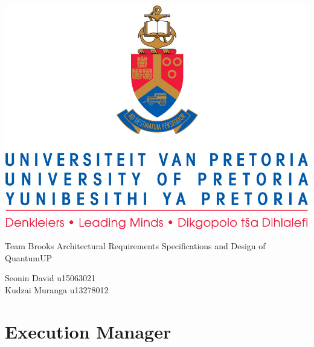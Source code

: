 \documentclass[]{article}
\begin{document}
\selectfont
	\begin{center}\thispagestyle{empty}
		\includegraphics{uplogo.jpg}
		
		{\Huge 
			Team Brooks \linebreak
			Architectural Requirements Specifications and Design of QuantumUP \linebreak 
			\par}
		 
        
        \begin{LARGE}
            Seonin David u15063021	\\
            Kudzai Muranga	u13278012
            \linebreak
            \linebreak
         
            \linebreak
            \linebreak
         
            \linebreak
            \linebreak
       
            \linebreak
            \linebreak
           
        \end{LARGE}
    \end{center}
    
    \newpage
	\tableofcontents
	\newpage
	\clearpage
	
    \section{Execution Manager}
    
    \newpage
    
\end{document}
